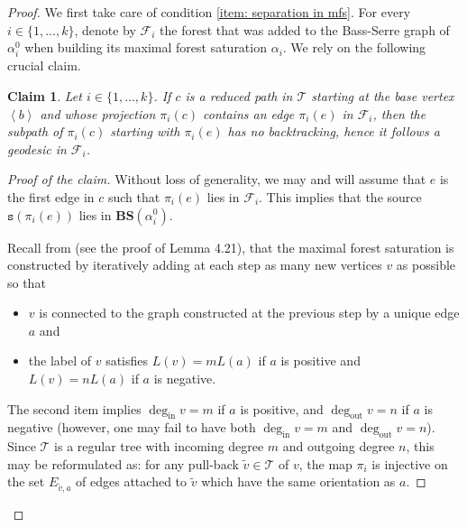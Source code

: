 \documentclass[12pt]{article}
\numberwithin{equation}{section}
\newtheorem{claim}[equation]{Claim}
\theoremstyle{definition}
\newenvironment{cproof}{\begin{proof}[Proof of the
        claim]\renewcommand*{\qedsymbol}{\(\square_\text{claim}\)}}{\end{proof}}
\newcommand{\la}{\left\langle}
\newcommand{\ra}{\right\rangle}
\newcommand\BSe{\mathbf{BS}}
\newcommand\degout{\deg_{\mathrm{out}}}
\newcommand\degin{\deg_{\mathrm{in}}}
\newcommand\Tree{\mathcal{T}}
\newcommand{\source}{\mathtt{s}}
\newcommand\pathinT{c}
\begin{document}
\begin{proof}
    We first take care of condition \ref{item: separation in mfs}.
    For every $i\in\{1,...,k\}$, denote by $\mathcal{F}_i$ the forest that was added to the
    Bass-Serre graph of $\alpha_i^0$
    when building its maximal forest saturation $\alpha_i$. 
    We rely on the following crucial claim.
    
    \begin{claim}\label{claim: no backtracking once in Fi}
                Let $i\in\{1,\dots,k\}$.
                If $\pathinT$ is a reduced path in $\Tree$ starting at the base vertex $\la b \ra$ and whose projection $\pi_i(\pathinT)$ contains an edge $\pi_i(e)$ in $\mathcal{F}_i$, then the subpath of $\pi_i(\pathinT)$
                starting with $\pi_i(e)$ has no backtracking, hence it follows a geodesic in $\mathcal{F}_i$.
    \end{claim}
            \begin{cproof}
                Without loss of generality, we may and will assume that $e$ is the first edge in $\pathinT$ such that $\pi_i(e)$ lies in $\mathcal{F}_i$.
                This implies that the source $\source(\pi_i(e))$ lies in $\BSe(\alpha_{i}^0)$.
                
                Recall from \cite{CGLMS-22} (see the proof of Lemma 4.21),
                that the maximal forest saturation is constructed by iteratively adding at each step as many new vertices $v$ as possible so that 
                \begin{itemize}
                    \item $v$ is connected to the graph constructed at the previous step by a unique edge $a$ and   
                    
                    \item the label of $v$ satisfies $L(v) = m L(a)$ if $a$ is positive and $L(v) = n L(a)$ if $a$ is negative.
                    
                \end{itemize}
                The second item implies $\degin{v} = m$ if $a$ is positive, and  $\degout{v} = n$ if $a$ is negative (however, one may fail to have both $\degin{v} = m$ and  $\degout{v} = n$).
                Since $\Tree$ is a regular tree with incoming degree $m$ and outgoing degree $n$, this may be reformulated as: for any pull-back $\tilde v\in \Tree$ of $v$, the map $\pi_i$ is injective on the set $E_{\tilde v, a}$ of edges attached to $\tilde v$ which have the same orientation as $a$. 
                

\end{cproof}
\end{proof}
\end{document}
